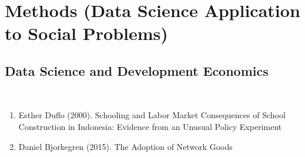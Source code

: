 \section{Methods (Data Science Application to Social Problems)}
\subsection{Data Science and Development Economics}  \\  
\begin{enumerate}  
\item  Esther Duflo (2000).  Schooling and Labor Market Consequences of School Construction in Indonesia: Evidence from an Unusual Policy Experiment \cite{Duflo_2000} 
\item Daniel Bjorkegren (2015).  The Adoption of Network Goods \cite{Bjorkegren} 
\end{enumerate}  
\\  
